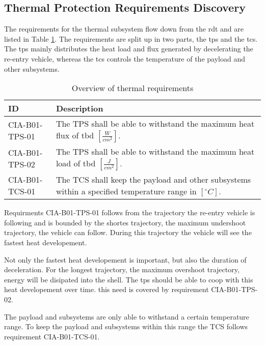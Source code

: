 \subsection{Thermal Protection Requirements Discovery} \label{sec:therm}
The requirements for the thermal subsystem flow down from the \gls{rdt} and are listed in Table \ref{tab:thermalreq}. The requirements are split up in two parts, the \gls{tps} and the \gls{tcs}. The \gls{tps} mainly distributes the heat load and flux generated by decelerating the re-entry vehicle, whereas the \gls{tcs} controls the temperature of the payload and other subsystems.


\begin{table}[H]
	\caption{Overview of thermal requirements}
	\begin{tabular}{|p{}|p{}|}
    \hline
    ID          & Description                                                                                                      \\ \hline \hline
    CIA-B01-TPS-01 & The TPS shall be able to withstand the maximum heat flux of \gls{tbd} $ \left[\frac{W}{cm^2}\right] $.               
\\ \hline
    CIA-B01-TPS-02 &  The TPS shall be able to withstand the maximum heat load of \gls{tbd} $ \left[\frac{J}{cm^2}\right] $.                
\\ \hline
    CIA-B01-TCS-01 & The TCS shall keep the payload and other subsystems within a specified temperature range in $\left[^{\circ}C\right]$.                                            
\\ \hline
    \end{tabular}
    \label{tab:thermalreq}
\end{table}

Requirments CIA-B01-TPS-01 follows from the trajectory the re-entry vehicle is following and is bounded by the shortes trajectory, the maximum undershoot trajectory, the vehicle can follow. During this trajectory the vehicle will see the fastest heat developement.

Not only the fastest heat developement is important, but also the duration of deceleration. For the longest trajectory, the maximum overshoot trajectory, energy will be disipated into the shell. The \gls{tps} should be able to coop with this heat developement over time. this need is covered by requirement CIA-B01-TPS-02.

The payload and subsystems are only able to withstand a certain temperature range. To keep the payload and subsystems within this range the TCS follows requirement CIA-B01-TCS-01.

